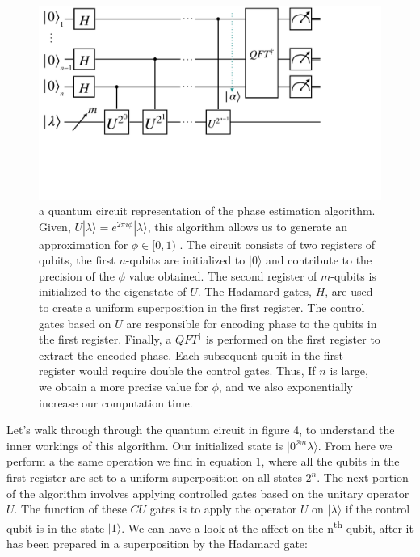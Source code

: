 \documentclass[twocolumn,showpacs,preprintnumbers,amsmath,amssymb]{revtex4}
\begin{document}
	    
		\begin{figure}[!h]
			\centering
			\includegraphics[trim={1cm 12cm 11cm 0},clip, width=0.99 \linewidth]{"graphics/phase_circ"}
			\caption{a quantum circuit representation of the phase estimation algorithm. Given, $ U |\lambda \rangle = e^{2\pi i \phi} |\lambda \rangle $, this algorithm allows us to generate an  approximation for $\phi \in [0,1)$ . The circuit consists of two registers of qubits, the first $n$-qubits are initialized to $|0\rangle$ and contribute to the precision of the $\phi$ value obtained. The second register of $m$-qubits is initialized to the eigenstate of $U$.  The Hadamard gates, $H$, are used to create a uniform superposition in the first register. The control gates based on $U$ are responsible for encoding phase to the qubits in the first register. Finally, a $QFT^\dagger$ is performed on the first register to extract the encoded phase. Each subsequent qubit in the first register would require double the control gates. Thus, If $n$ is large, we obtain a more precise value for $\phi$, and we also exponentially increase our computation time.}
			\label{fig:phasrcircuit}
		\end{figure}
		
		
		Let's walk through through the quantum circuit in figure 4, to understand the inner workings of this algorithm.	 Our initialized state is $|0^{\otimes n} \lambda\rangle$. From here we perform a the same operation we find in equation 1, where all the qubits in the first register are set to a uniform superposition on all states $2^n$. The next portion of the algorithm involves applying controlled gates based on the unitary operator $U$. The function of these $CU$ gates is to apply the operator $U$ on $|\lambda\rangle$ if the control qubit is in the state $|1\rangle$. We can have a look at the affect on the n\textsuperscript{th} qubit, after it has been prepared in a superposition by the Hadamard gate:
		
\end{document}
